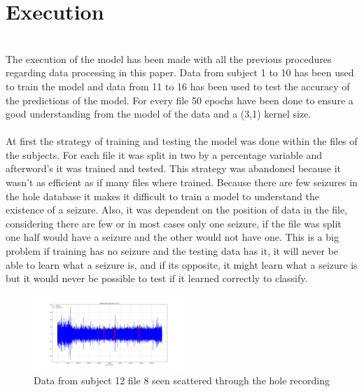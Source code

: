\section{Execution}
\leavevmode\\
The execution of the model has been made with all the previous procedures regarding data processing in this paper. Data from subject 1 to 10 has been used to train the model and data from 11 to 16 has been used to test the accuracy of the predictions of the model. For every file 50 epochs have been done to ensure a good understanding from the model of the data and a (3,1) kernel size.
\\\\
At first the strategy of training and testing the model was done within the files of the subjects. For each file it was split in two by a percentage variable and afterword’s it was trained and tested. This strategy was abandoned because it wasn’t as efficient as if many files where trained. Because there are few seizures in the hole database it makes it difficult to train a model to understand the existence of a seizure. Also, it was dependent on the position of data in the file, considering there are few or in most cases only one seizure, if the file was split one half would have a seizure and the other would not have one. This is a big problem if training has no seizure and the testing data has it, it will never be able to learn what a seizure is, and if its opposite, it might learn what a seizure is but it would never be possible to test if it learned correctly to classify.
\leavevmode\\
\begin{figure}[h!]
  \caption{Data from subject 12 file 8 seen scattered through the hole recording}
  \centering
  \includegraphics[width=0.5\textwidth]{img/12_8-elecFP1-F7.png}
\end{figure}

